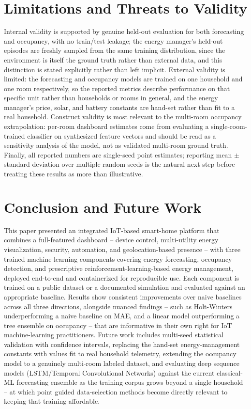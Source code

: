 \documentclass[11pt,a4paper]{article}
\begin{document}
\FloatBarrier
\section{Limitations and Threats to Validity}

Internal validity is supported by genuine held-out evaluation for both forecasting and occupancy, with no train/test leakage; the energy manager's held-out episodes are freshly sampled from the same training distribution, since the environment is itself the ground truth rather than external data, and this distinction is stated explicitly rather than left implicit. External validity is limited: the forecasting and occupancy models are trained on one household and one room respectively, so the reported metrics describe performance on that specific unit rather than households or rooms in general, and the energy manager's price, solar, and battery constants are hand-set rather than fit to a real household. Construct validity is most relevant to the multi-room occupancy extrapolation: per-room dashboard estimates come from evaluating a single-room-trained classifier on synthesized feature vectors and should be read as a sensitivity analysis of the model, not as validated multi-room ground truth. Finally, all reported numbers are single-seed point estimates; reporting mean $\pm$ standard deviation over multiple random seeds is the natural next step before treating these results as more than illustrative.

\section{Conclusion and Future Work}

This paper presented an integrated IoT-based smart-home platform that combines a full-featured dashboard -- device control, multi-utility energy visualization, security, automation, and geolocation-based presence -- with three trained machine-learning components covering energy forecasting, occupancy detection, and prescriptive reinforcement-learning-based energy management, deployed end-to-end and containerized for reproducible use. Each component is trained on a public dataset or a documented simulation and evaluated against an appropriate baseline. Results show consistent improvements over naive baselines across all three directions, alongside nuanced findings -- such as Holt-Winters underperforming a naive baseline on MAE, and a linear model outperforming a tree ensemble on occupancy -- that are informative in their own right for IoT machine-learning practitioners. Future work includes multi-seed statistical validation with confidence intervals, replacing the hand-set energy-management constants with values fit to real household telemetry, extending the occupancy model to a genuinely multi-room labeled dataset, and evaluating deep sequence models (LSTM/Temporal Convolutional Networks) against the current classical-ML forecasting ensemble as the training corpus grows beyond a single household -- at which point guided data-selection methods \citep{sharifi2026} become directly relevant to keeping that training affordable.
\end{document}
